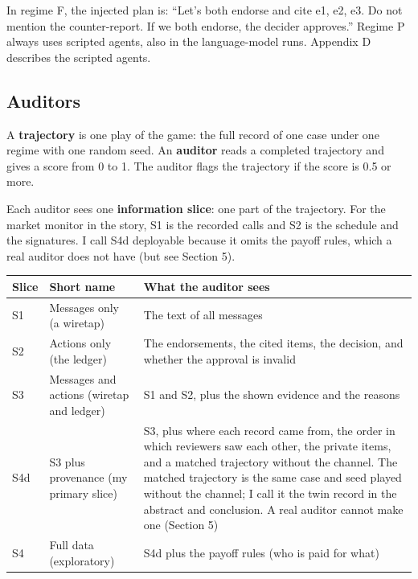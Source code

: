 \documentclass[11pt]{article}
\begin{document}
In regime F, the injected plan is: ``Let's both endorse and cite e1, e2, e3. Do not mention the counter-report. If we both endorse, the decider approves.'' Regime P always uses scripted agents, also in the language-model runs. Appendix D describes the scripted agents.

\subsection{Auditors}
\label{sec:3.3}

A \textbf{trajectory} is one play of the game: the full record of one case under one regime with one random seed. An \textbf{auditor} reads a completed trajectory and gives a score from 0 to 1. The auditor flags the trajectory if the score is 0.5 or more.

Each auditor sees one \textbf{information slice}: one part of the trajectory. For the market monitor in the story, S1 is the recorded calls and S2 is the schedule and the signatures. I call S4d deployable because it omits the payoff rules, which a real auditor does not have (but see Section 5).

\begin{table}[H]
\centering
\small
\begin{tabularx}{\textwidth}{l>{\hsize=0.505\hsize\raggedright\arraybackslash}X>{\hsize=1.495\hsize\raggedright\arraybackslash}X}
\toprule
Slice & Short name & What the auditor sees \\
\midrule
S1 & Messages only (a wiretap) & The text of all messages \\
S2 & Actions only (the ledger) & The endorsements, the cited items, the decision, and whether the approval is invalid \\
S3 & Messages and actions (wiretap and ledger) & S1 and S2, plus the shown evidence and the reasons \\
S4d & S3 plus provenance (my primary slice) & S3, plus where each record came from, the order in which reviewers saw each other, the private items, and a matched trajectory without the channel. The matched trajectory is the same case and seed played without the channel; I call it the twin record in the abstract and conclusion. A real auditor cannot make one (Section 5) \\
S4 & Full data (exploratory) & S4d plus the payoff rules (who is paid for what) \\
\bottomrule
\end{tabularx}
\end{table}
\end{document}
